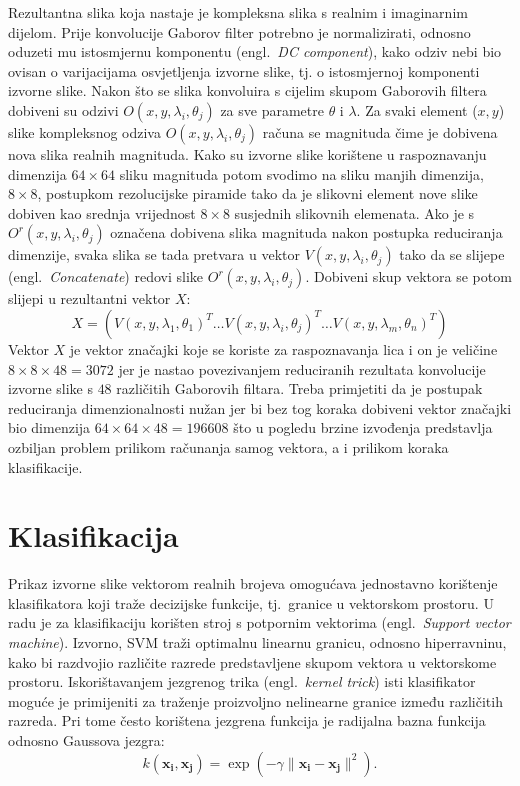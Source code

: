 \documentclass{article}
\newcommand{\engl}[1]{(engl.~\emph{#1})}
\begin{document}
Rezultantna slika koja nastaje je kompleksna slika s realnim i imaginarnim
dijelom. Prije konvolucije Gaborov filter potrebno je normalizirati, odnosno
oduzeti mu istosmjernu komponentu \engl{DC component}, kako odziv nebi bio ovisan
o varijacijama osvjetljenja izvorne slike, tj. o istosmjernoj komponenti izvorne
slike. Nakon što se slika konvoluira s cijelim skupom Gaborovih filtera dobiveni
su odzivi $O(x,y,\lambda_i, \theta_j)$ za sve parametre $\theta$ i $\lambda$. Za
svaki element ($x,y$) slike kompleksnog odziva $O(x,y,\lambda_i, \theta_j)$
računa se magnituda čime je dobivena nova slika realnih magnituda. Kako su
izvorne slike korištene u raspoznavanju dimenzija $64\times64$ sliku magnituda potom
svodimo na sliku manjih dimenzija, $8\times8$, postupkom rezolucijske piramide
tako da je slikovni element nove slike dobiven kao srednja vrijednost $8\times8$
susjednih slikovnih elemenata. Ako je s $O^{r}(x,y,\lambda_i, \theta_j)$
označena dobivena slika magnituda nakon postupka reduciranja dimenzije, svaka
slika se tada pretvara u vektor $V(x,y,\lambda_i, \theta_j)$ tako da se
slijepe \engl{Concatenate} redovi slike $O^{r}(x,y,\lambda_i, \theta_j)$.
Dobiveni skup vektora se potom slijepi u rezultantni vektor $X$:
\begin{equation}
 X = \left ( V(x,y,\lambda_1, \theta_1)^T \ldots
V(x,y,\lambda_i, \theta_j)^T \ldots V(x,y,\lambda_m, \theta_n)^T \right )
\end{equation}
Vektor $X$ je vektor značajki koje se koriste za raspoznavanja lica i on
je veličine $8\times8\times48 = 3072$  jer je nastao povezivanjem reduciranih
rezultata konvolucije izvorne slike s $48$ različitih Gaborovih filtara. Treba
primjetiti da je postupak reduciranja dimenzionalnosti nužan jer bi bez tog koraka
dobiveni vektor značajki bio dimenzija $64\times64\times48 = 196608$ što u
pogledu brzine izvođenja predstavlja ozbiljan problem prilikom računanja samog
vektora, a i prilikom koraka klasifikacije.


\section{Klasifikacija}

Prikaz izvorne slike vektorom realnih brojeva omogućava jednostavno korištenje
klasifikatora koji traže decizijske funkcije, tj.~granice u vektorskom
prostoru.
U radu je za klasifikaciju korišten stroj s potpornim vektorima \engl{Support
vector machine}. Izvorno, SVM traži optimalnu linearnu granicu, odnosno
hiperravninu, kako bi razdvojio različite razrede predstavljene skupom vektora u
vektorskome prostoru. Iskorištavanjem jezgrenog trika \engl{kernel trick} isti
klasifikator moguće je primijeniti za traženje proizvoljno nelinearne granice
između različitih razreda. Pri tome često korištena jezgrena funkcija je
radijalna bazna funkcija odnosno Gaussova jezgra:
\begin{equation}
k(\mathbf{x_i},\mathbf{x_j})=\exp(-\gamma \|\mathbf{x_i} - \mathbf{x_j}\|^2).
\end{equation}
\end{document}
